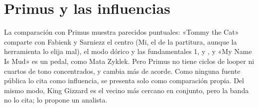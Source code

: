 \section{Primus y las influencias}

La comparación con Primus muestra parecidos puntuales: «Tommy the Cat» comparte con Fabienk y Sarniezz el centro (Mi, el de la
partitura, aunque la herramienta lo elija mal), el modo dórico y las fundamentales 1,  y , y «My Name Is Mud» es un pedal, como Mata Zyklek. Pero Primus no tiene ciclos
de looper ni cuartos de tono concentrados, y cambia más de acorde. Como ninguna fuente pública lo cita como influencia, se
presenta solo como comparación propia. Del mismo modo, King Gizzard es el vecino más cercano en conjunto, pero la banda no
lo cita; lo propone un analista.

